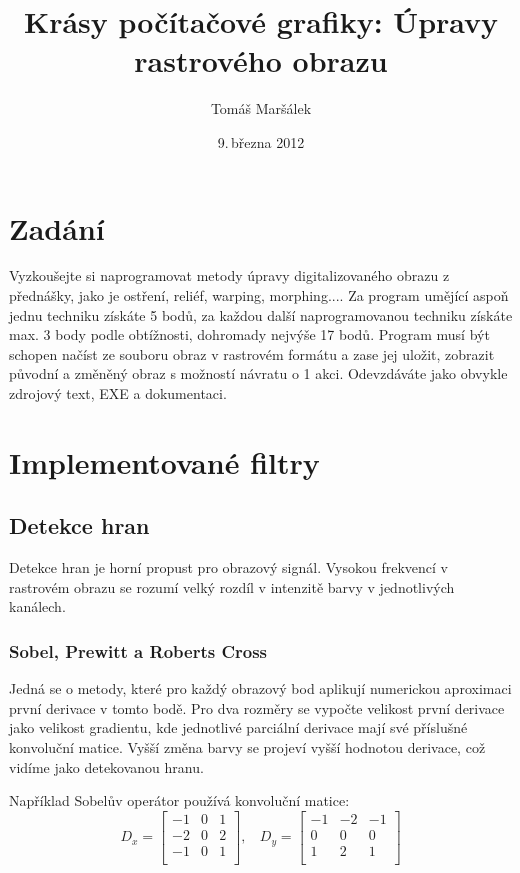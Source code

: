 \documentclass[11pt]{article}
\title{Krásy počítačové grafiky: Úpravy rastrového obrazu}
\author{Tomáš Maršálek}
\date{9.\,března 2012}
\begin{document}
\maketitle

\section{Zadání}
Vyzkoušejte si naprogramovat metody úpravy digitalizovaného obrazu z přednášky,
jako je ostření, reliéf, warping, morphing.... Za program umějící aspoň jednu
techniku získáte 5 bodů, za každou další naprogramovanou techniku získáte max.
3 body podle obtížnosti, dohromady nejvýše 17 bodů. Program musí být schopen
načíst ze souboru obraz v rastrovém formátu a zase jej uložit, zobrazit původní
a změněný obraz s možností návratu o 1 akci. Odevzdáváte jako obvykle zdrojový
text, EXE a dokumentaci.

\section{Implementované filtry}
\subsection{Detekce hran}
Detekce hran je horní propust pro obrazový signál. Vysokou frekvencí v
rastrovém obrazu se rozumí velký rozdíl v intenzitě barvy v jednotlivých
kanálech.

\subsubsection{Sobel, Prewitt a Roberts Cross}
Jedná se o metody, které pro každý obrazový bod aplikují numerickou aproximaci
první derivace v tomto bodě. Pro dva rozměry se vypočte velikost první derivace
jako velikost gradientu, kde jednotlivé parciální derivace mají své příslušné
konvoluční matice. Vyšší změna barvy se projeví vyšší hodnotou derivace, což
vidíme jako detekovanou hranu. 

Například Sobelův operátor používá konvoluční matice: \\
$$
D_x = 
\left[
\begin{array}{ccc}
-1 & 0 & 1 \\
-2 & 0 & 2 \\
-1 & 0 & 1 \\
\end{array}
\right]
,~~~~
D_y = 
\left[
\begin{array}{ccc}
-1 & -2 & -1 \\
0 & 0 & 0 \\
1 & 2 & 1 \\
\end{array}
\right]
$$
\end{document}
